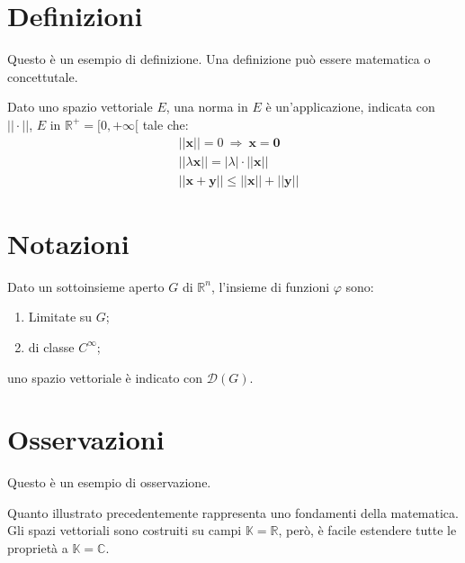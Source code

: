 \section{Definizioni}

Questo è un esempio di definizione. Una definizione può essere matematica o concettutale.

\begin{definition}
Dato uno spazio vettoriale $E$, una norma in $E$ è un'applicazione, indicata con $||\cdot||$, $E$ in $\mathbb{R}^+=[0,+\infty[$ tale che:
\begin{align}
& ||\mathbf{x}||=0\ \Rightarrow\ \mathbf{x}=\mathbf{0}\\
& ||\lambda \mathbf{x}||=|\lambda|\cdot ||\mathbf{x}||\\
& ||\mathbf{x}+\mathbf{y}||\leq ||\mathbf{x}||+||\mathbf{y}||
\end{align}
\end{definition}


\section{Notazioni}

\begin{notation}
Dato un sottoinsieme aperto $G$ di $\mathbb{R}^n$, l'insieme di funzioni $\varphi$ sono:
\begin{enumerate}
\item Limitate su $G$;
\item di classe $C^\infty$;
\end{enumerate}
uno spazio vettoriale è indicato con $\mathcal{D}(G)$. 
\end{notation}


\section{Osservazioni}

Questo è un esempio di osservazione.

\begin{remark}
Quanto illustrato precedentemente rappresenta uno fondamenti della matematica. Gli spazi vettoriali sono costruiti su campi $\mathbb{K}=\mathbb{R}$, però, è facile estendere tutte le proprietà a $\mathbb{K}=\mathbb{C}$.
\end{remark}

